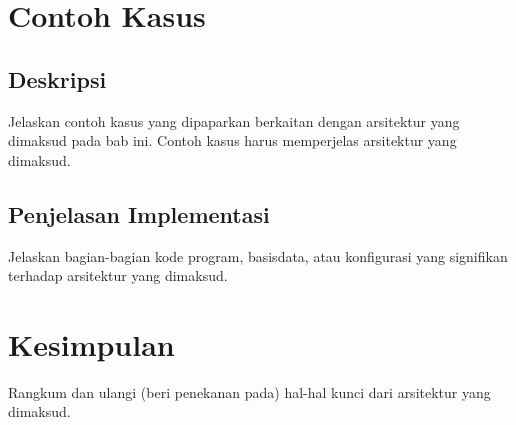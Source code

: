 \section{Contoh Kasus}

\subsection{Deskripsi}
Jelaskan contoh kasus yang dipaparkan berkaitan dengan arsitektur yang dimaksud pada bab ini.
Contoh kasus harus memperjelas arsitektur yang dimaksud.

\subsection{Penjelasan Implementasi}
Jelaskan bagian-bagian kode program, basisdata, atau konfigurasi yang signifikan terhadap arsitektur yang dimaksud.

\section{Kesimpulan}
Rangkum dan ulangi (beri penekanan pada) hal-hal kunci dari arsitektur yang dimaksud.